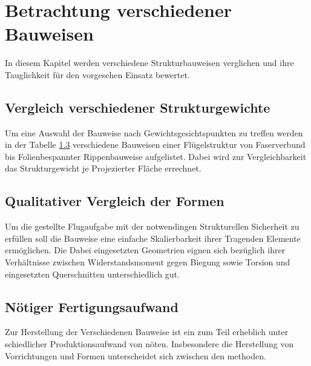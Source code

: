 \chapter{Betrachtung verschiedener Bauweisen}\label{cha:Statistische Betrachtung bisheriger Bauformen}

In diesem Kapitel werden verschiedene Strukturbauweisen verglichen und ihre Tauglichkeit für den vorgesehen Einsatz bewertet.

\section{Vergleich verschiedener Strukturgewichte}

Um eine Auswahl der Bauweise nach Gewichtsgesichtspunkten zu treffen werden in der Tabelle \ref{} verschiedene Bauweisen einer Flügelstruktur von Faserverbund bis Folienbespannter Rippenbauweise aufgelistet. Dabei wird zur Vergleichbarkeit das Strukturgewicht je Projezierter Fläche errechnet.

\section{Qualitativer Vergleich der Formen}

Um die gestellte Flugaufgabe mit der notwendingen Strukturellen Sicherheit zu erfüllen soll die Bauweise eine einfache Skalierbarkeit ihrer Tragenden Elemente ermöglichen.
Die Dabei eingesetzten Geometrien eignen sich bezüglich ihrer Verhältnisse zwischen Widerstandsmoment gegen Biegung sowie Torsion und eingesetzten Querschnitten unterschiedlich gut.


\section{Nötiger Fertigungsaufwand}

Zur Herstellung der Verschiedenen Bauweise ist ein zum Teil erheblich unter schiedlicher Produktionsaufwand von nöten. Insbesondere die Herstellung von Vorrichtungen und Formen unterscheidet sich zwischen den methoden. 